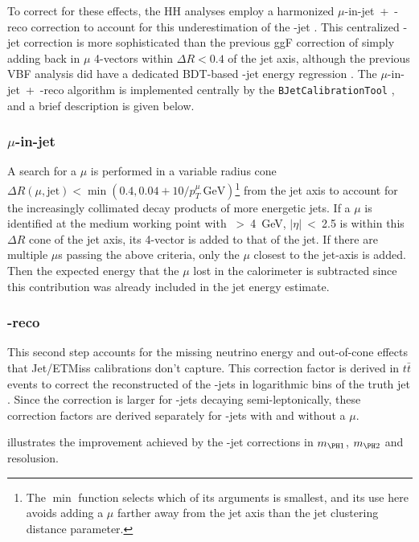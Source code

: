 To correct for these effects, the HH analyses employ a harmonized $\mu$-in-jet~+~\pT-reco correction to account for this underestimation of the \Pqb-jet \pT. 
This centralized \Pqb-jet correction is more sophisticated than the previous ggF correction of simply adding back in $\mu$ 4-vectors within $\Delta R < 0.4$ of the jet axis, although the previous VBF analysis did have a dedicated BDT-based \Pqb-jet energy regression \cite{HDBS-2018-18-witherratum}.  
The $\mu$-in-jet~+~\pT-reco algorithm is implemented centrally by the \texttt{BJetCalibrationTool} \cite{BJetCalibrationTool}, and a brief description is given below.

\subsubsection{$\mu$-in-jet}

A search for a $\mu$ is performed in a variable radius cone $\Delta R(\mu, \text{jet}) < \min \left( 0.4, 0.04 + 10 / p_T^{\mu} \ \text{GeV} \right)$\footnote{The $\min$ function selects which of its arguments is smallest, and its use here avoids adding a $\mu$ farther away from the jet axis than the jet clustering distance parameter.} from the jet axis to account for the increasingly collimated decay products of more energetic jets.
If a $\mu$ is identified at the medium working point with \pT~>~4~GeV, $|\eta|$~<~2.5 is within this $\Delta R$ cone of the jet axis, its 4-vector is added to that of the jet. If there are multiple $\mu$s passing the above criteria, only the $\mu$ closest to the jet-axis is added. Then the expected energy that the $\mu$ lost in the calorimeter is subtracted since this contribution was already included in the jet energy estimate.

\subsubsection{\pT-reco}

This second step accounts for the missing neutrino energy and out-of-cone effects that Jet/ETMiss calibrations don't capture.
This correction factor is derived in $t\bar{t}$ events to correct the reconstructed \pT of the \Pqb-jets in logarithmic bins of the truth jet \pT. 
Since the correction is larger for \Pqb-jets decaying semi-leptonically, these correction factors are derived separately for \Pqb-jets with and without a $\mu$. 

\Fig{\ref{fig:bjetcalib-plots}} illustrates the improvement achieved by the \Pqb-jet corrections in $m_{\PH1}$, $m_{\PH2}$ and \mhh resolusion.

